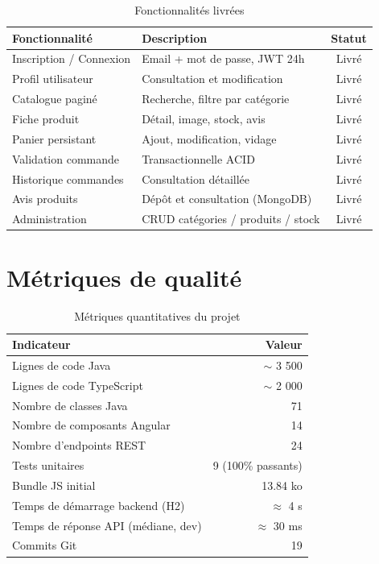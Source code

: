 \documentclass[11pt,a4paper,oneside]{report}
\begin{document}
\begin{table}[htbp]
\centering
\caption{Fonctionnalités livrées}
\label{tab:bilan}
\small
\begin{tabularx}{\textwidth}{lXc}
\toprule
\textbf{Fonctionnalité} & \textbf{Description} & \textbf{Statut}\\
\midrule
Inscription / Connexion & Email + mot de passe, JWT 24h            & Livré \\
Profil utilisateur      & Consultation et modification             & Livré \\
Catalogue paginé        & Recherche, filtre par catégorie          & Livré \\
Fiche produit           & Détail, image, stock, avis               & Livré \\
Panier persistant       & Ajout, modification, vidage              & Livré \\
Validation commande     & Transactionnelle ACID                    & Livré \\
Historique commandes    & Consultation détaillée                   & Livré \\
Avis produits           & Dépôt et consultation (MongoDB)          & Livré \\
Administration          & CRUD catégories / produits / stock       & Livré \\
\bottomrule
\end{tabularx}
\end{table}

\section{Métriques de qualité}

\begin{table}[htbp]
\centering
\caption{Métriques quantitatives du projet}
\label{tab:metrics}
\small
\begin{tabularx}{\textwidth}{Xr}
\toprule
\textbf{Indicateur} & \textbf{Valeur}\\
\midrule
Lignes de code Java                              & $\sim$ 3 500 \\
Lignes de code TypeScript                        & $\sim$ 2 000 \\
Nombre de classes Java                           & 71 \\
Nombre de composants Angular                     & 14 \\
Nombre d'endpoints REST                          & 24 \\
Tests unitaires                                  & 9 (100\% passants) \\
Bundle JS initial                                & 13.84 ko \\
Temps de démarrage backend (H2)                  & $\approx$ 4 s \\
Temps de réponse API (médiane, dev)              & $\approx$ 30 ms \\
Commits Git                                      & 19 \\
\bottomrule
\end{tabularx}
\end{table}
\end{document}
